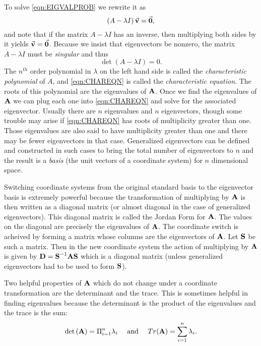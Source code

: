 To solve \eqref{eqn:EIGVALPROB} we rewrite it as
\begin{equation}
   \left(A - \lambda I\right) \vec{\textbf{v}} = \vec{\textbf{0}},
\end{equation}
and note that if the matrix $A-\lambda I$ has an inverse, 
then multiplying both sides by it yields $\vec{\textbf{v}}=\vec{\textbf{0}}$.
Because we insist that eigenvectors be nonzero,
the matrix $A-\lambda I$ must be \emph{singular} and thus
\begin{equation}
   \det\left(A-\lambda I\right) = 0.
   \label{eqn:CHAREQN}
\end{equation}
The $n^{th}$ order polynomial in $\lambda$ on the left hand side is called
the \emph{characteristic polynomial}
of $A$, and
\eqref{eqn:CHAREQN} is 
called the \emph{characteristic equation}.
The roots of this polynomial are the eigenvalues of ${\textbf{A}}$.
Once we find the eigenvalues of ${\textbf{A}}$ we can plug each one into \eqref{eqn:CHAREQN}
and solve for the associated eigenvector.  Usually there are $n$ eigenvalues and
$n$ eigenvectors, though some trouble may arise if \eqref{eqn:CHAREQN} has roots
of multiplicity greater than one.  Those eigenvalues are also said to have multiplicity
greater than one and there may be fewer eigenvectors in that case.  Generalized
eigenvectors can be defined and constructed in such cases to bring the total
number of eigenvectors to $n$ and the result is a \emph{basis} (the unit vectors
of a coordinate system) for $n$ dimensional space.

Switching coordinate systems from the original standard basis to the eigenvector
basis is extremely powerful because the transformation of multiplying by ${\textbf{A}}$ 
is then written as a diagonal matrix (or almost diagonal in the case of generalized 
eigenvectors).  This diagonal matrix is called the Jordan Form for ${\textbf{A}}$.  The 
values on the diagonal are precisely the eigenvalues of ${\textbf{A}}$.  The coordinate
switch is acheived by forming a matrix whose columns are the eigenvectors of ${\textbf{A}}$.
Let ${\textbf{S}}$ be such a matrix.  Then in the new coordinate system the action of multiplying
by ${\textbf{A}}$ is given by ${\textbf{D}}={\textbf{S}}^{-1}{\textbf{A}}{\textbf{S}}$ which is a diagonal matrix (unless generalized
eigenvectors had to be used to form ${\textbf{S}}$).

Two helpful properties of ${\textbf{A}}$ which do not change under a coordinate transformation
are the determinant and the trace.  This is sometimes helpful in finding eigenvalues because
the determinant is the product of the eigenvalues and the trace is the sum:
\[
  \det{\left( {{\textbf{A}}} \right)} = \Pi_{i=1}^n \lambda_i  \quad \mbox{ and } \quad Tr{\left( {{\textbf{A}}} \right)}=\sum_{i=1}^n \lambda_i.
\]

